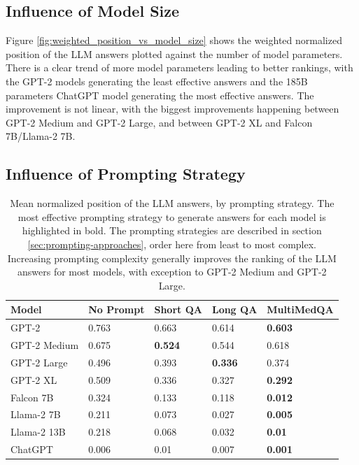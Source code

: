 \subsection{Influence of Model Size}
Figure \ref{fig:weighted_position_vs_model_size} shows the weighted normalized position of the LLM answers plotted against the number of model parameters.
There is a clear trend of more model parameters leading to better rankings, with the GPT-2 models generating the least effective answers and the 185B parameters ChatGPT model generating the most effective answers.
The improvement is not linear, with the biggest improvements happening between GPT-2 Medium and GPT-2 Large, and between GPT-2 XL and Falcon 7B/Llama-2 7B.


\subsection{Influence of Prompting Strategy}
\begin{table}[tb]
\centering
\begin{tabular}{lllll}
\hline
\textbf{Model}        & \textbf{No Prompt} & \textbf{Short QA}     & \textbf{Long QA} & \textbf{MultiMedQA} \\\hline
GPT-2        & 0.763      & 0.663 & 0.614    & \textbf{0.603}      \\
GPT-2 Medium & 0.675      & \textbf{0.524} & 0.544    & 0.618      \\
GPT-2 Large  & 0.496      & 0.393 & \textbf{0.336}    & 0.374      \\
GPT-2 XL     & 0.509      & 0.336 & 0.327    & \textbf{0.292}      \\
Falcon 7B    & 0.324      & 0.133 & 0.118    & \textbf{0.012}      \\
Llama-2 7B   & 0.211      & 0.073 & 0.027    & \textbf{0.005}      \\
Llama-2 13B  & 0.218      & 0.068 & 0.032    & \textbf{0.01 }      \\
ChatGPT      & 0.006      & 0.01  & 0.007    & \textbf{0.001}     \\
\hline
\end{tabular}
\caption{Mean normalized position of the LLM answers, by prompting strategy.
The most effective prompting strategy to generate answers for each model is highlighted in bold.
The prompting strategies are described in section \ref{sec:prompting-approaches}, order here from least to most complex.
Increasing prompting complexity generally improves the ranking of the LLM answers for most models, with exception to GPT-2 Medium and GPT-2 Large.
}
\label{tab:prompting_strategy}
\end{table}
